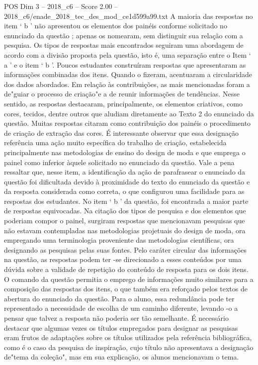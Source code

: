 \begin{textsample}{POS Dim 3 – 2018\_c6 – Score 2.00 – 2018\_c6/enade\_2018\_tec\_des\_mod\_ce1d599a99.txt}
A maioria das respostas no item ‘ b ’ não apresentou os elementos dos painéis conforme solicitado no enunciado da questão ; apenas os nomearam, sem distinguir sua relação com a pesquisa.
Os tipos de respostas mais encontrados seguiram uma abordagem de acordo com a divisão proposta pela questão, isto é, uma separação entre o Item ‘ a ’ e o item ‘ b ’.
Poucos estudantes construíram respostas que apresentaram as informações combinadas dos itens.
Quando o fizeram, acentuaram a circularidade dos dados abordados.
Em relação às contribuições, as mais mencionadas foram a de"guiar o processo de criação"e a de reunir informações de tendências.
Nesse sentido, as respostas destacaram, principalmente, os elementos criativos, como cores, tecidos, dentre outros que aludiam diretamente ao Texto 2 do enunciado da questão.
Muitas respostas citaram como contribuição dos painéis o procedimento de criação de extração das cores.
É interessante observar que essa designação referência uma ação muito específica do trabalho de criação, estabelecida principalmente nas metodologias de ensino do design de moda e que emprega o painel como inferior àquele solicitado no enunciado da questão.
Vale a pena ressaltar que, nesse item, a identificação da ação de parafrasear o enunciado da questão foi dificultada devido à proximidade do texto do enunciado da questão e da resposta considerada como correta, o que configurou uma facilidade para as respostas dos estudantes.
No item ‘ b ’ da questão, foi encontrada a maior parte de respostas equivocadas.
Na citação dos tipos de pesquisa e dos elementos que poderiam compor o painel, surgiram respostas que mencionavam pesquisas que não estavam contempladas nas metodologias projetuais do design de moda, ora empregando uma terminologia proveniente das metodologias científicas, ora designando as pesquisas pelas suas fontes.
Pelo caráter circular das informações na questão, as respostas podem ter -se direcionado a esses conteúdos por uma dúvida sobre a validade de repetição do conteúdo de resposta para os dois itens.
O comando da questão permitia o emprego de informações muito similares para a composição das respostas dos itens, o que também era reforçado pelos textos de abertura do enunciado da questão.
Para o aluno, essa redundância pode ter representado a necessidade de escolha de um caminho diferente, levando -o a pensar que talvez a resposta não poderia ser tão semelhante.
É necessário destacar que algumas vezes os títulos empregados para designar as pesquisas eram frutos de adaptações sobre os títulos utilizados pela referência bibliográfica, como é o caso da pesquisa de inspiração, cujo título não apresentava a designação de"tema da coleção", mas em sua explicação, os alunos mencionavam o tema.

\end{textsample}
